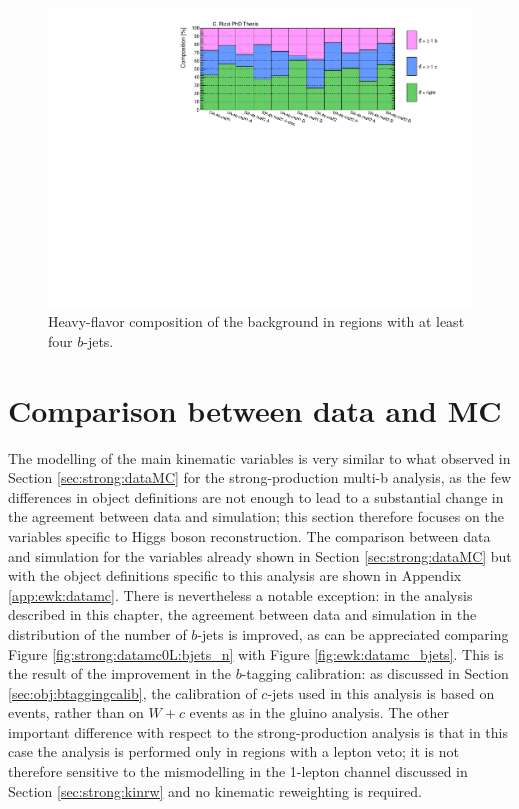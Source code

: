 \begin{figure}[htbp]
\includegraphics[width=\textwidth]{figures/ewk_prod/comp_plots/hh_4b_HF.pdf}
\caption{Heavy-flavor composition of the \ttbar background in regions with at least four $b$-jets.}
	\label{fig:HFcomp_hh4b}
\end{figure}

\FloatBarrier

\section{Comparison between data and MC}

The modelling of the main kinematic variables is very similar to what observed in Section \ref{sec:strong:dataMC} 
for the strong-production multi-b analysis, as the few differences in object definitions are not enough to 
lead to a substantial change in the agreement between data and simulation; 
this section therefore focuses on the variables specific to Higgs boson reconstruction.
The comparison between data and simulation for the variables already shown in Section \ref{sec:strong:dataMC} but with the object definitions 
specific to this analysis are shown in Appendix \ref{app:ewk:datamc}.
There is nevertheless a notable exception: in the analysis described in this chapter, the agreement between data and simulation in the 
distribution of the number of $b$-jets is improved, as can be appreciated comparing Figure \ref{fig:strong:datamc0L:bjets_n} with Figure \ref{fig:ewk:datamc_bjets}.
This is the result of the improvement in the $b$-tagging calibration: as discussed in Section \ref{sec:obj:btaggingcalib}, 
the calibration of $c$-jets used in this analysis is based on \ttbar events, rather than on $W+c$ events as in the gluino analysis.
The other important difference with respect to the strong-production analysis is that in this case the analysis is performed 
only in regions with a lepton veto; it is not therefore sensitive to the mismodelling in the 1-lepton channel discussed in Section 
\ref{sec:strong:kinrw} and no kinematic reweighting is required. 

